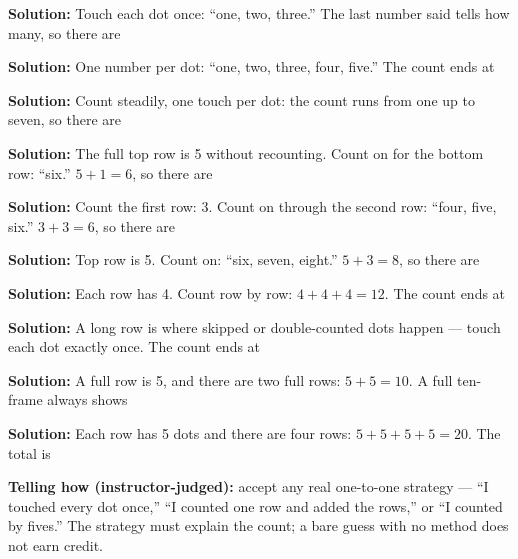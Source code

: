 \documentclass[12pt]{article}
\begin{document}



\textbf{Solution:} Touch each dot once: ``one, two, three.'' The last number
said tells how many, so there are 


\textbf{Solution:} One number per dot: ``one, two, three, four, five.'' The
count ends at 


\textbf{Solution:} Count steadily, one touch per dot: the count runs from one
up to seven, so there are 


\textbf{Solution:} The full top row is 5 without recounting. Count on for the
bottom row: ``six.'' $5 + 1 = 6$, so there are 


\textbf{Solution:} Count the first row: 3. Count on through the second row:
``four, five, six.'' $3 + 3 = 6$, so there are 


\textbf{Solution:} Top row is 5. Count on: ``six, seven, eight.'' $5 + 3 = 8$,
so there are 


\textbf{Solution:} Each row has 4. Count row by row: $4 + 4 + 4 = 12$. The
count ends at 


\textbf{Solution:} A long row is where skipped or double-counted dots happen
--- touch each dot exactly once. The count ends at 


\textbf{Solution:} A full row is 5, and there are two full rows:
$5 + 5 = 10$. A full ten-frame always shows 


\textbf{Solution:} Each row has 5 dots and there are four rows:
$5 + 5 + 5 + 5 = 20$. The total is 

\textbf{Telling how (instructor-judged):} accept any real one-to-one strategy
--- ``I touched every dot once,'' ``I counted one row and added the rows,'' or
``I counted by fives.'' The strategy must explain the count; a bare guess with
no method does not earn credit.
\end{document}
